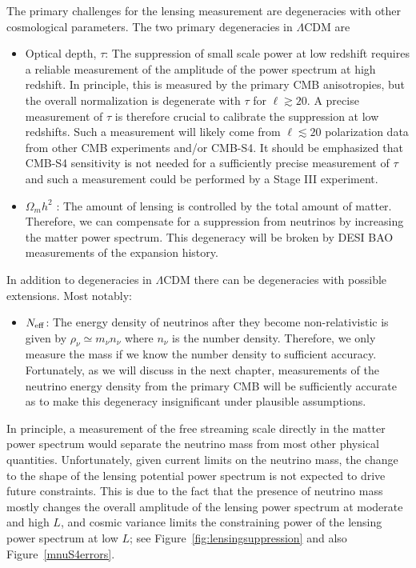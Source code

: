 The primary challenges for the lensing measurement are degeneracies with other cosmological parameters.  The two primary degeneracies in $\Lambda$CDM are
\begin{itemize}
\item Optical depth, $\tau$: The suppression of small scale power at low redshift requires a reliable measurement of the amplitude of the power spectrum at high redshift.  In principle, this is measured by the primary CMB anisotropies, but the overall normalization is degenerate with $\tau$ for $\ell \gtrsim 20$.  A precise measurement of $\tau$ is therefore crucial to calibrate the suppression at low redshifts.  Such a measurement will likely come from $\ell \lesssim 20$ polarization data from other CMB experiments and/or CMB-S4.  It should be emphasized that CMB-S4 sensitivity is not needed for a sufficiently precise measurement of $\tau$ and such a measurement could be performed by a Stage III experiment.


\item $\Omega_m h^2$ : The amount of lensing is controlled by the total amount of matter.  Therefore, we can compensate for a suppression from neutrinos by increasing the matter power spectrum.  This degeneracy will be broken by DESI BAO measurements of the expansion history.
\end{itemize}
In addition to degeneracies in $\Lambda$CDM there can be degeneracies with possible extensions.  Most notably:
\begin{itemize}
\item $N_{\rm eff}$: The energy density of neutrinos after they become non-relativistic is given by $\rho_\nu \simeq m_\nu n_\nu$ where $n_\nu$ is the number density.  Therefore, we only measure the mass if we know the number density to sufficient accuracy.  Fortunately, as we will discuss in the next chapter, measurements of the neutrino energy density from the primary CMB will be sufficiently accurate as to make this degeneracy insignificant under plausible assumptions.
\end{itemize}
In principle, a measurement of the free streaming scale directly in the matter power spectrum would separate the neutrino mass from most other physical quantities.  Unfortunately, given current limits on the neutrino mass, the change to the shape of the lensing potential power spectrum is not expected to drive future constraints.  This is due to the fact that the presence of neutrino mass mostly changes the overall amplitude of the lensing power spectrum at moderate and high $L$, and cosmic variance limits the constraining power of the lensing power spectrum at low $L$; see Figure~\ref{fig:lensingsuppression} and also Figure~\ref{mnuS4errors}.

